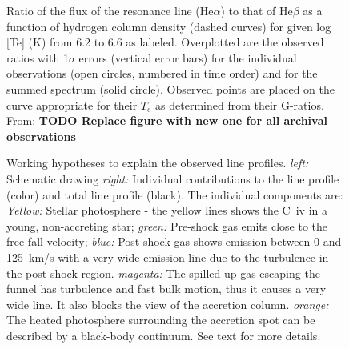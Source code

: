 \documentclass[letterpaper,11pt,twocolumn]{article}
\begin{document}
\begin{figure}[h!]
\centering
{}
\caption{Ratio of the flux of the resonance line (He$\alpha$) to that of He$\beta$ as a function of hydrogen column density (dashed curves) for given log [Te] (K) from 6.2 to 6.6 as labeled. Overplotted are the observed ratios with 1$\sigma$ errors (vertical error bars) for the individual observations (open circles, numbered in time order) and for the summed spectrum (solid circle). Observed points are placed on the curve appropriate for their $T_e$ as determined from their G-ratios. 
From: 
  \textbf{TODO Replace figure with new one for all archival observations}
\label{fig:allspec} }
\end{figure}

\begin{figure}
\caption{\label{fig:CIVsketch} Working hypotheses to explain the observed line
  profiles. \emph{left:} Schematic drawing \emph{right:} Individual
  contributions to the line profile (color) and total line
  profile (black). The individual components are: \emph{Yellow:} Stellar
  photosphere - the yellow lines shows the C~{\sc iv} in a young,
  non-accreting star; \emph{green:} Pre-shock gas emits close to the free-fall
  velocity; \emph{blue:} Post-shock gas shows emission between 0 and 125~km/s
  with a very wide emission line due to the turbulence in the post-shock
  region. \emph{magenta:} The spilled up gas escaping the funnel has turbulence
and fast bulk motion, thus it causes a very wide line. It also blocks the view
of the accretion column. \emph{orange:} The heated photosphere surrounding the
accretion spot can be described by a black-body continuum. See text for more details.}
\end{figure}
\end{document}
